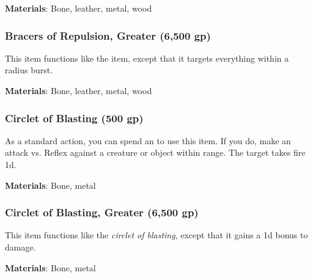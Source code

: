 \vspace{0.25em}
\textbf{Materials}: Bone, leather, metal, wood


\lowercase{\hypertarget{item:Bracers of Repulsion, Greater}{}}\label{item:Bracers of Repulsion, Greater}
\hypertarget{item:Bracers of Repulsion, Greater}{\subsubsection{Bracers of Repulsion, Greater\hfill{} (6,500 gp)}}

This item functions like the  item, except that it targets everything within a \arealarge radius burst.



\vspace{0.25em}
\textbf{Materials}: Bone, leather, metal, wood


\lowercase{\hypertarget{item:Circlet of Blasting}{}}\label{item:Circlet of Blasting}
\hypertarget{item:Circlet of Blasting}{\subsubsection{Circlet of Blasting\hfill{} (500 gp)}}

As a standard action, you can spend an  to use this item.
If you do, make an attack vs. Reflex against a creature or object within \rngmed range.
\hit The target takes fire  \plus1d.



\vspace{0.25em}
\textbf{Materials}: Bone, metal


\lowercase{\hypertarget{item:Circlet of Blasting, Greater}{}}\label{item:Circlet of Blasting, Greater}
\hypertarget{item:Circlet of Blasting, Greater}{\subsubsection{Circlet of Blasting, Greater\hfill{} (6,500 gp)}}

This item functions like the \textit{circlet of blasting}, except that it gains a \plus1d bonus to damage.



\vspace{0.25em}
\textbf{Materials}: Bone, metal


